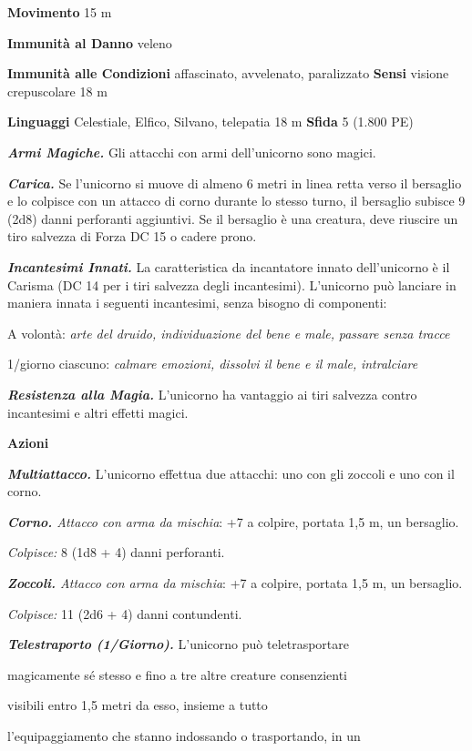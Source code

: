 \begin{multicols}{2}
\textbf{Movimento} 15 m

\textbf{Immunità al Danno} veleno

\textbf{Immunità alle Condizioni} affascinato, avvelenato, paralizzato
\textbf{Sensi} visione crepuscolare 18 m

\textbf{Linguaggi} Celestiale, Elfico, Silvano, telepatia 18 m
\textbf{Sfida} 5 (1.800 PE)

\emph{\textbf{Armi Magiche.}} Gli attacchi con armi dell'unicorno sono
magici.

\emph{\textbf{Carica.}} Se l'unicorno si muove di almeno 6 metri in
linea retta verso il bersaglio e lo colpisce con un attacco di corno
durante lo stesso turno, il bersaglio subisce 9 (2d8) danni perforanti
aggiuntivi. Se il bersaglio è una creatura, deve riuscire un tiro
salvezza di Forza DC 15 o cadere prono.

\emph{\textbf{Incantesimi Innati.}} La caratteristica da incantatore
innato dell'unicorno è il Carisma (DC 14 per i tiri salvezza degli
incantesimi). L'unicorno può lanciare in maniera innata i seguenti
incantesimi, senza bisogno di componenti:

A volontà: \emph{arte del druido, individuazione del bene e male,}
\emph{passare senza tracce}

1/giorno ciascuno: \emph{calmare emozioni, dissolvi il bene e il male,}
\emph{intralciare}

\emph{\textbf{Resistenza alla Magia.}} L'unicorno ha vantaggio ai tiri
salvezza contro incantesimi e altri effetti magici.

\textbf{Azioni}

\emph{\textbf{Multiattacco.}} L'unicorno effettua due attacchi: uno con
gli zoccoli e uno con il corno.

\emph{\textbf{Corno.} Attacco con arma da mischia}: +7 a colpire,
portata 1,5 m, un bersaglio.

\emph{Colpisce:} 8 (1d8 + 4) danni perforanti.

\emph{\textbf{Zoccoli.} Attacco con arma da mischia}: +7 a colpire,
portata 1,5 m, un bersaglio.

\emph{Colpisce:} 11 (2d6 + 4) danni contundenti.

\emph{\textbf{Telestraporto (1/Giorno).}} L'unicorno può teletrasportare

magicamente sé stesso e fino a tre altre creature consenzienti

visibili entro 1,5 metri da esso, insieme a tutto

l'equipaggiamento che stanno indossando o trasportando, in un


\end{multicols}
